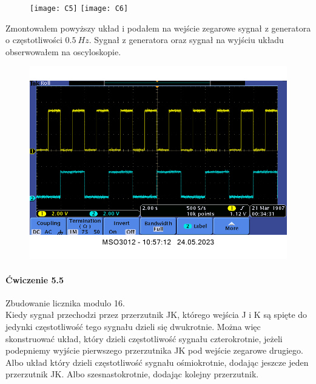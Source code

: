 \documentclass[14pt, table]{extarticle}
\begin{document}
\newpage

\begin{figure}[H]
\texttt{[image: C5]}
\texttt{[image: C6]}
\centering
\captionsetup{labelformat=empty}
\caption{}
\end{figure}

Zmontowałem powyższy układ i podałem na wejście zegarowe sygnał z generatora o częstotliwości $0.5 \ Hz$. Sygnał z generatora oraz sygnał na wyjściu układu obserwowałem na oscyloskopie.

\begin{figure}[H]
\includegraphics[width=16cm]{A0}
\centering
\captionsetup{labelformat=empty}
\caption{}
\end{figure}

\newpage
\paragraph{Ćwiczenie 5.5 \\}

Zbudowanie licznika modulo 16. \\
	
Kiedy sygnał przechodzi przez przerzutnik JK, którego wejścia J i K są spięte do jedynki częstotliwość tego sygnału dzieli się dwukrotnie. Można więc skonstruować układ, który dzieli częstotliwość sygnału czterokrotnie, jeżeli podepniemy wyjście pierwszego przerzutnika JK pod wejście zegarowe drugiego. Albo układ który dzieli częstotliwość sygnału ośmiokrotnie, dodając jeszcze jeden przerzutnik JK. Albo szesnastokrotnie, dodając kolejny przerzutnik. \\
\end{document}
